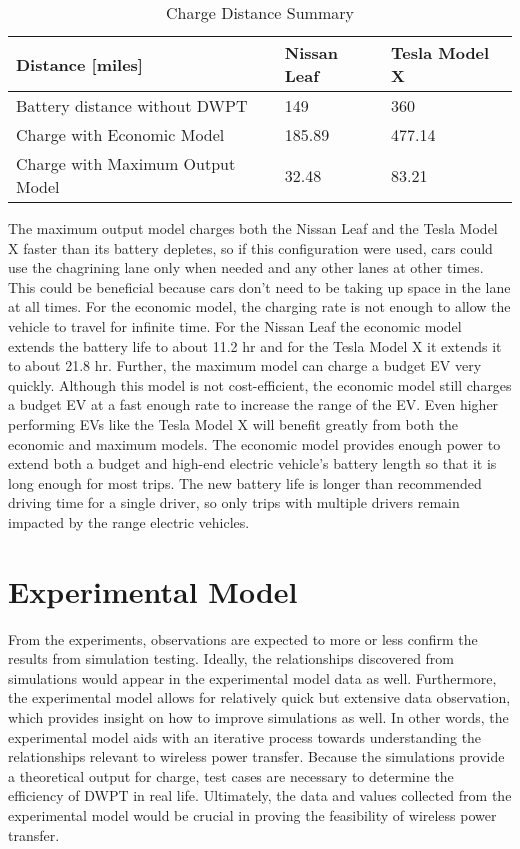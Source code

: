 \begin{table}[H]
    \caption[Charge Distance Summary]{Charge Distance Summary}
    \begin{center}
    \begin{tabular}{| p{} | p{} | p{} |}
    \hline
    Distance [miles] & Nissan Leaf & Tesla Model X \\
    \hline \hline
    Battery distance without DWPT & 149 & 360 \\
    \hline
    Charge with Economic Model & 185.89 & 477.14 \\
    \hline
    Charge with Maximum Output Model & 32.48 & 83.21 \\
    \hline
    \end{tabular}
    \end{center}
    \label{t12}
\end{table}

The maximum output model charges both the Nissan Leaf and the Tesla Model X faster than its battery depletes, 
so if this configuration were used, cars could use the chagrining lane only when needed and any other lanes at 
other times.  This could be beneficial because cars don’t need to be taking up space in the lane at all times.  
For the economic model, the charging rate is not enough to allow the vehicle to travel for infinite time. 
For the Nissan Leaf the economic model extends the battery life to about 11.2 hr and for the Tesla Model X it 
extends it to about 21.8 hr. Further, the maximum model can charge a budget EV very quickly. Although this model 
is not cost-efficient, the economic model still charges a budget EV at a fast enough rate to increase the range 
of the EV. Even higher performing EVs like the Tesla Model X will benefit greatly from both the economic and 
maximum models. The economic model provides enough power to extend both a budget and high-end electric vehicle’s 
battery length so that it is long enough for most trips. The new battery life is longer than recommended driving 
time for a single driver, so only trips with multiple drivers remain impacted by the range electric vehicles. 

\section{Experimental Model}
From the experiments, observations are expected to more or less confirm the results from simulation testing. 
Ideally, the relationships discovered from simulations would appear in the experimental model data as well. 
Furthermore, the experimental model allows for relatively quick but extensive data observation, which provides 
insight on how to improve simulations as well. In other words, the experimental model aids with an iterative process 
towards understanding the relationships relevant to wireless power transfer. Because the simulations provide a 
theoretical output for charge, test cases are necessary to determine the efficiency of DWPT in real life. 
Ultimately, the data and values collected from the experimental model would be crucial in proving the feasibility 
of wireless power transfer.

